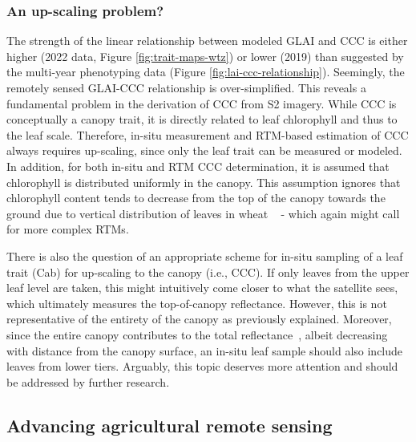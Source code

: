 \subsubsection{An up-scaling problem?}

The strength of the linear relationship between modeled GLAI and CCC is either higher (2022 data, Figure \ref{fig:trait-maps-wtz}) or lower (2019) than suggested by the multi-year phenotyping data (Figure \ref{fig:lai-ccc-relationship}). Seemingly, the remotely sensed GLAI-CCC relationship is over-simplified. This reveals a fundamental problem in the derivation of CCC from S2 imagery. While CCC is conceptually a canopy trait, it is directly related to leaf chlorophyll and thus to the leaf scale. Therefore, in-situ measurement and RTM-based estimation of CCC always requires up-scaling, since only the leaf trait can be measured or modeled. In addition, for both in-situ and RTM CCC determination, it is assumed that chlorophyll is distributed uniformly in the canopy. This assumption ignores that chlorophyll content tends to decrease from the top of the canopy towards the ground due to vertical distribution of leaves in wheat ~\citep{huang_estimation_2011} - which again might call for more complex RTMs.

There is also the question of an appropriate scheme for in-situ sampling of a leaf trait (Cab) for up-scaling to the canopy (i.e., CCC). If only leaves from the upper leaf level are taken, this might intuitively come closer to what the satellite sees, which ultimately measures the top-of-canopy reflectance. However, this is not representative of the entirety of the canopy as previously explained. Moreover, since the entire canopy contributes to the total reflectance~\citep{kuusk_markov_1995, wang_canopy_2013, dodorico_vertical_2018}, albeit decreasing with distance from the canopy surface, an in-situ leaf sample should also include leaves from lower tiers. Arguably, this topic deserves more attention and should be addressed by further research.

\subsection{Advancing agricultural remote sensing}

